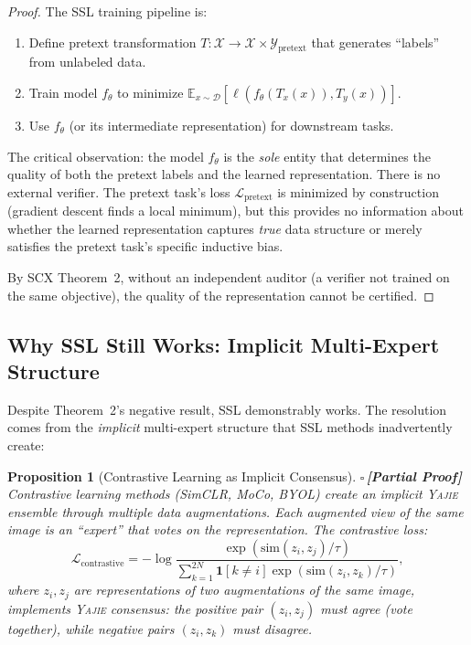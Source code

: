 \documentclass[12pt,a4paper]{article}
\newtheorem{proposition}[theorem]{Proposition}
\theoremstyle{definition}
\newcommand{\rigorPartial}{{\color{rigorcolor}$\square$\,\textbf{[Partial Proof]}}}
\newcommand{\Yajie}{\textsc{Yajie}}
\newcommand{\SCX}{\textsc{SCX}}
\newcommand{\E}{\mathbb{E}}
\newcommand{\cD}{\mathcal{D}}
\newcommand{\cX}{\mathcal{X}}
\newcommand{\cY}{\mathcal{Y}}
\newcommand{\ind}[1]{\mathbf{1}[#1]}
\begin{document}
\begin{proof}
The SSL training pipeline is:
\begin{enumerate}[nosep]
    \item Define pretext transformation $T: \cX \to \cX \times \cY_{\text{pretext}}$ that generates ``labels'' from unlabeled data.
    \item Train model $f_\theta$ to minimize $\E_{x \sim \cD}[\ell(f_\theta(T_x(x)), T_y(x))]$.
    \item Use $f_\theta$ (or its intermediate representation) for downstream tasks.
\end{enumerate}

The critical observation: the model $f_\theta$ is the \emph{sole} entity that determines the quality of both the pretext labels and the learned representation. There is no external verifier. The pretext task's loss $\mathcal{L}_{\text{pretext}}$ is minimized by construction (gradient descent finds a local minimum), but this provides no information about whether the learned representation captures \emph{true} data structure or merely satisfies the pretext task's specific inductive bias.

By \SCX{} Theorem~2, without an independent auditor (a verifier not trained on the same objective), the quality of the representation cannot be certified.
\end{proof}

\subsection*{Why SSL Still Works: Implicit Multi-Expert Structure}

Despite Theorem~2's negative result, SSL demonstrably works. The resolution comes from the \emph{implicit} multi-expert structure that SSL methods inadvertently create:

\begin{proposition}[Contrastive Learning as Implicit Consensus]\label{prop:simclr_consensus}
\rigorPartial
Contrastive learning methods (SimCLR, MoCo, BYOL) create an implicit \Yajie{} ensemble through multiple data augmentations. Each augmented view of the same image is an ``expert'' that votes on the representation. The contrastive loss:
\begin{equation}\label{eq:simclr_loss}
    \mathcal{L}_{\text{contrastive}} = -\log \frac{\exp(\text{sim}(z_i, z_j)/\tau)}{\sum_{k=1}^{2N} \ind{k \neq i} \exp(\text{sim}(z_i, z_k)/\tau)},
\end{equation}
where $z_i, z_j$ are representations of two augmentations of the same image, implements \Yajie{} consensus: the positive pair $(z_i, z_j)$ must agree (vote together), while negative pairs $(z_i, z_k)$ must disagree.
\end{proposition}
\end{document}

